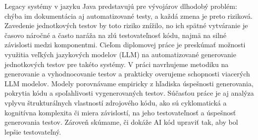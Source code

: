 Legacy systémy v jazyku Java predstavujú pre vývojárov dlhodobý problém: chýba im dokumentácia aj automatizované testy, a každá zmena je preto riziková.
Zavedenie jednotkových testov by toto riziko znížilo, no ich spätné vytváranie je časovo náročné a často naráža na zlú testovateľnosť kódu,
najmä na silné závislosti medzi komponentmi.
Cieľom diplomovej práce je preskúmať možnosti využitia veľkých jazykových modelov (LLM) na automatizované generovanie jednotkových testov pre takéto systémy. 
V práci navrhujeme metodiku na generovanie a vyhodnocovanie testov a prakticky overujeme schopnosti viacerých LLM modelov.
Modely porovnávame empiricky z hľadiska úspešnosti generovania, pokrytia kódu a spoľahlivosti vygenerovaných testov.
Súčasťou práce je aj analýza vplyvu štrukturálnych vlastností zdrojového kódu, ako sú cyklomatická a kognitívna komplexita či miera závislostí, na jeho testovateľnosť a úspešnosť generovania testov.
Zároveň skúmame, či dokáže AI kód upraviť tak, aby bol lepšie testovateľný. 
